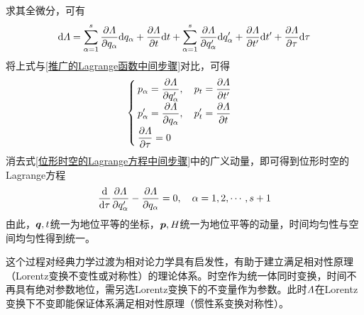求其全微分，可有
\begin{equation*}
	\mathrm{d} \mathnormal{\Lambda} = \sum_{\alpha=1}^s \frac{\partial \mathnormal{\Lambda}}{\partial q_\alpha} \mathrm{d} q_\alpha + \frac{\partial \mathnormal{\Lambda}}{\partial t} \mathrm{d} t + \sum_{\alpha=1}^s \frac{\partial \mathnormal{\Lambda}}{\partial q'_\alpha} \mathrm{d} q'_\alpha + \frac{\partial \mathnormal{\Lambda}}{\partial t'} \mathrm{d} t' + \frac{\partial \mathnormal{\Lambda}}{\partial \tau} \mathrm{d} \tau
\end{equation*}
将上式与\eqref{推广的Lagrange函数中间步骤}对比，可得
\begin{equation}
	\begin{cases}
		\displaystyle p_\alpha = \frac{\partial \mathnormal{\Lambda}}{\partial q'_\alpha},\quad p_t = \frac{\partial \mathnormal{\Lambda}}{\partial t'} \\[1.5ex]
		\displaystyle p'_\alpha = \frac{\partial \mathnormal{\Lambda}}{\partial q_\alpha},\quad p'_t = \frac{\partial \mathnormal{\Lambda}}{\partial t} \\[1.5ex]
		\displaystyle \frac{\partial \mathnormal{\Lambda}}{\partial \tau} = 0
	\end{cases}
	\label{位形时空的Lagrange方程中间步骤}
\end{equation}
消去式\eqref{位形时空的Lagrange方程中间步骤}中的广义动量，即可得到{\heiti 位形时空的Lagrange方程}
\begin{equation}
	\frac{\mathrm{d}}{\mathrm{d} \tau} \frac{\partial \mathnormal{\Lambda}}{\partial q'_\alpha} - \frac{\partial \mathnormal{\Lambda}}{\partial q_\alpha} = 0,\quad \alpha = 1,2,\cdots,s+1
	\label{位形时空的Lagrange方程}
\end{equation}
由此，$\boldsymbol{q},t$统一为地位平等的坐标，$\boldsymbol{p},H$统一为地位平等的动量，时间均匀性与空间均匀性得到统一。

这个过程对经典力学过渡为相对论力学具有启发性，有助于建立满足相对性原理（Lorentz变换不变性或对称性）的理论体系。时空作为统一体同时变换，时间不再具有绝对参数地位，需另选Lorentz变换下的不变量作为参数。此时$\mathnormal{\Lambda}$在Lorentz变换下不变即能保证体系满足相对性原理（惯性系变换对称性）。

\iffalse
这部分并不是完全基于上节内容，用有限的篇幅很难说清楚，故去掉。
\subsection{狭义相对论的分析力学形式}

狭义相对论下的变换应满足
\begin{equation*}
	\sum_{i=1}^3 \tilde{x}_i^2 - (c\tilde{t})^2 = \sum_{i=1}^3 x_i^2 - (ct)^2
\end{equation*}
取坐标系使得两参考系之间的相对速度方向为$x_1$轴方向，则有{\heiti Lorentz变换}
\begin{equation}
\begin{cases}
	\displaystyle \tilde{x}_1 = \frac{x_1 - Vt}{\sqrt{1-\dfrac{V^2}{c^2}}} \\[1.5ex]
	\tilde{x}_2 = x_2 \\[1.5ex]
	\tilde{x}_3 = x_3 \\[1.5ex]
	\displaystyle \tilde{t} = \frac{t - \dfrac{V}{c^2}x_1}{\sqrt{1-\dfrac{V^2}{c^2}}}
\end{cases}
\end{equation}\fi
